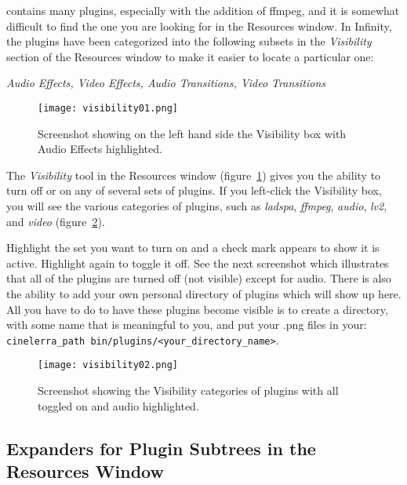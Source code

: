\CGG{} contains many plugins, especially with the addition of ffmpeg, and it is somewhat difficult to find the one you are looking for in the Resources window. In \CGG{} Infinity, the plugins have been categorized into the following subsets in the \textit{Visibility} section of the Resources window to make it easier to locate a particular one:

\textit{Audio Effects, \quad Video Effects, \quad Audio Transitions, \quad Video Transitions}

\begin{figure}[htpb]
    \centering
    \texttt{[image: visibility01.png]}
    \caption{Screenshot showing on the left hand side the Visibility box with Audio Effects highlighted.}
    \label{fig:visibility01}
\end{figure}

The \textit{Visibility} tool in the Resources window (figure~\ref{fig:visibility01}) gives you the ability to turn off or on any of several sets of plugins. If you left-click the Visibility box, you will see the various categories of plugins, such as \textit{ladspa}, \textit{ffmpeg}, \textit{audio}, \textit{lv2}, and \textit{video} (figure~\ref{fig:visibility02}).

Highlight the set you want to turn on and a check mark appears to show it is active. Highlight again to toggle it off. See the next screenshot which illustrates that all of the plugins are turned off (not visible) except for audio. There is also the ability to add your own personal directory of plugins which will show up here. All you have to do to have these plugins become visible is to create a directory, with some name that is meaningful to you, and put your .png files in your: \\
\texttt{cinelerra\_path bin/plugins/<your\_directory\_name>}.

\begin{figure}[htpb]
    \centering
    \texttt{[image: visibility02.png]}
    \caption{Screenshot showing the Visibility categories of plugins with all toggled on and audio highlighted.}
    \label{fig:visibility02}
\end{figure}

\subsection{Expanders for Plugin Subtrees in the Resources Window}%
\label{sub:expanders_plugin_subtrees}

